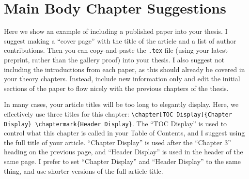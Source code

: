 \section{Main Body Chapter Suggestions} \label{Ch3:Suggestions}

Here we show an example of including a published paper into your thesis. I suggest making a ``cover page'' with the title of the article and a list of author contributions. Then you can copy-and-paste the \texttt{.tex} file (using your latest preprint, rather than the gallery proof) into your thesis. I also suggest not including the introductions from each paper, as this should already be covered in your theory chapters. Instead, include new information only and edit the initial sections of the paper to flow nicely with the previous chapters of the thesis.


In many cases, your article titles will be too long to elegantly display. Here, we effectively use three titles for this chapter: \texttt{\textbackslash chapter[TOC Display]\{Chapter Display\} \textbackslash chaptermark\{Header Display\}}. The ``TOC Display'' is used to control what this chapter is called in your Table of Contents, and I suggest using the full title of your article. ``Chapter Display'' is used after the ``Chapter 3'' heading on the previous page, and ``Header Display'' is used in the header of the same page. I prefer to set ``Chapter Display'' and ``Header Display'' to the same thing, and use shorter versions of the full article title. 